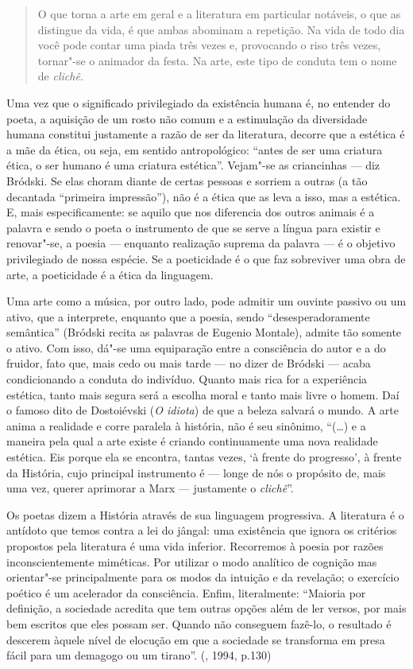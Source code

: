 {\begin{quote}
O que torna a arte em geral e a literatura em particular
notáveis, o que as distingue da vida, é que ambas abominam a repetição. Na vida de todo dia você pode
contar uma piada três vezes e, provocando o riso três vezes, tornar"-se o
animador da festa. Na arte, este tipo de conduta tem o nome de
\emph{clichê.}
\end{quote}

Uma vez que o significado privilegiado da existência humana é, no
entender do poeta, a aquisição de um rosto não comum e a
estimulação da diversidade humana constitui justamente a razão de ser da
literatura, decorre que a estética é a mãe da ética, ou seja, em sentido
antropológico: ``antes de ser uma criatura ética, o ser humano é uma
criatura estética''. Vejam"-se as criancinhas --- diz Bródski. Se elas
choram diante de certas pessoas e sorriem a outras (a tão decantada
``primeira impressão''), não é a ética que as leva a isso, mas a
estética. E, mais especificamente: se aquilo que nos diferencia
dos outros animais é a palavra e sendo o poeta o instrumento de que se
serve a língua para existir e renovar"-se, a poesia --- enquanto
realização suprema da palavra --- é o objetivo privilegiado de nossa
espécie. Se a poeticidade é o que faz sobreviver uma obra de arte, a
poeticidade é a ética da linguagem.

Uma arte como a música, por outro lado, pode admitir um ouvinte passivo
ou um ativo, que a interprete, enquanto que a poesia, sendo
``desesperadoramente semântica'' (Bródski recita as palavras de Eugenio Montale),
 admite tão somente o ativo. Com isso, dá"-se uma
equiparação entre a consciência do autor e a do fruidor, fato que, mais
cedo ou mais tarde --- no dizer de Bródski --- acaba condicionando a
conduta do indivíduo. Quanto mais rica for a experiência estética, tanto
mais segura será a escolha moral e tanto mais livre o homem. Daí o
famoso dito de Dostoiévski (\emph{O idiota}) de que a beleza salvará o mundo. A arte anima
a realidade e corre paralela à história, não é seu sinônimo, ``(\ldots{}) e a
maneira pela qual a arte existe é criando continuamente uma nova
realidade estética. Eis porque ela se encontra, tantas vezes, `à frente
do progresso', à frente da História, cujo principal instrumento é ---
longe de nós o propósito de, mais uma vez, querer aprimorar a Marx ---
justamente o \emph{clichê}''.

Os poetas dizem a História através de sua linguagem progressiva. A
literatura é o antídoto que temos contra a lei do jângal: uma existência
que ignora os critérios propostos pela literatura é uma vida inferior.
Recorremos à poesia por razões inconscientemente miméticas. Por utilizar
o modo analítico de cognição mas orientar"-se principalmente para os
modos da intuição e da revelação; o exercício poético é um acelerador da
consciência. Enfim, literalmente: ``Maioria por definição, a sociedade acredita que tem
outras opções além de ler versos, por mais bem
escritos que eles possam ser. Quando não conseguem fazê-lo, o resultado é descerem àquele nível de
 elocução em que a sociedade se transforma em presa fácil para um 
demagogo ou um tirano''. (, 1994, p.130)

}
